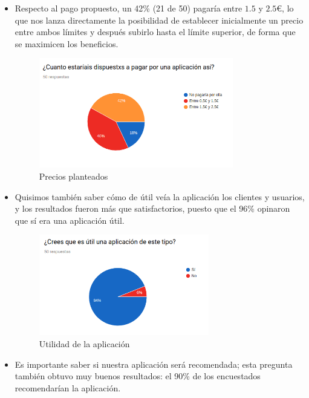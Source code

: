 \documentclass[12pt,a4paper]{article}
\begin{document}
\begin{itemize}
    \item Respecto al pago propuesto, un 42\% (21 de 50) pagaría entre $1.5$ y $2.5$€, lo que nos lanza directamente la posibilidad de establecer inicialmente un precio entre ambos límites y después subirlo hasta el límite superior, de forma que se maximicen los beneficios.
    
    \begin{figure}[H]
    \centering
        \includegraphics[width=0.8\textwidth]{pago.png}
        \caption{Precios planteados}
    \end{figure}
    
    \item Quisimos también saber cómo de útil veía la aplicación los clientes y usuarios, y los resultados fueron más que satisfactorios, puesto que el 96\% opinaron que sí era una aplicación útil.
    
    \begin{figure}[H]
    \centering
        \includegraphics[width=0.7\textwidth]{util.png}
        \caption{Utilidad de la aplicación}
    \end{figure}
    
    \item Es importante saber si nuestra aplicación será recomendada; esta pregunta también obtuvo muy buenos resultados: el 90\% de los encuestados recomendarían la aplicación.
    

\end{itemize}
\end{document}
